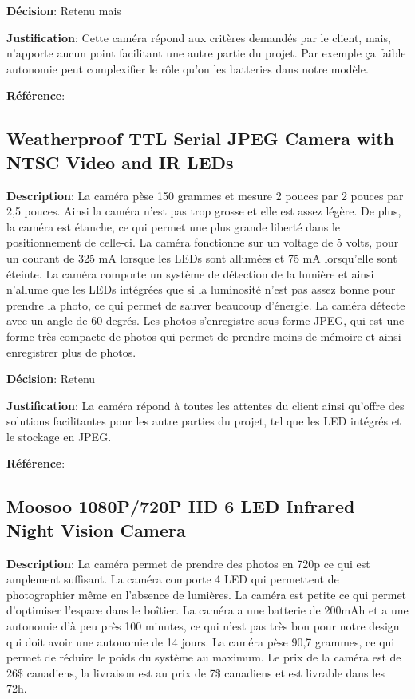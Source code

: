 	\textbf{Décision}: Retenu mais

	\textbf{Justification}: Cette caméra répond aux critères demandés par le client, mais, n’apporte aucun point facilitant une autre partie du projet. Par exemple ça faible autonomie peut complexifier le rôle qu’on les batteries dans notre modèle.
	
	\textbf{Référence}: \cite{papakoyal963L}
	
	\subsection{Weatherproof TTL Serial JPEG Camera with NTSC Video and IR LEDs}

	\textbf{Description}: La caméra pèse 150 grammes et mesure 2 pouces par 2 pouces par 2,5 pouces. Ainsi la caméra n’est pas trop grosse et elle est assez légère. De plus, la caméra est étanche, ce qui permet une plus grande liberté dans le positionnement de celle-ci. La caméra fonctionne sur un voltage de 5 volts, pour un courant de 325 mA lorsque les LEDs sont allumées et 75 mA lorsqu’elle sont éteinte. La caméra comporte un système de détection de la lumière et ainsi n’allume que les LEDs intégrées que si la luminosité n’est pas assez bonne pour prendre la photo, ce qui permet de sauver beaucoup d’énergie. La caméra détecte avec un angle de 60 degrés. Les photos s’enregistre sous forme JPEG, qui est une forme très compacte de photos qui permet de prendre moins de mémoire et ainsi enregistrer plus de photos.
	
	\textbf{Décision}: Retenu
	
	\textbf{Justification}: La caméra répond à toutes les attentes du client ainsi qu’offre des solutions facilitantes pour les autre parties du projet, tel que les LED intégrés et le stockage en JPEG.
	
	\textbf{Référence}: \cite{camweatherproof}
	
	\subsection{Moosoo 1080P/720P HD 6 LED Infrared Night Vision Camera}

	\textbf{Description}:  La caméra permet de prendre des photos en 720p ce qui est amplement suffisant. La caméra comporte 4 LED qui permettent de photographier même en l’absence de lumières. La caméra est petite ce qui permet d’optimiser l’espace dans le boîtier. La caméra a une batterie de 200mAh et a une autonomie d’à peu près 100 minutes, ce qui n’est pas très bon pour notre design qui doit avoir une autonomie de 14 jours. La caméra pèse 90,7 grammes, ce qui permet de réduire le poids du système au maximum. Le prix de la caméra est de 26\$ canadiens, la livraison est au prix de 7\$ canadiens et est livrable dans les 72h.
	
